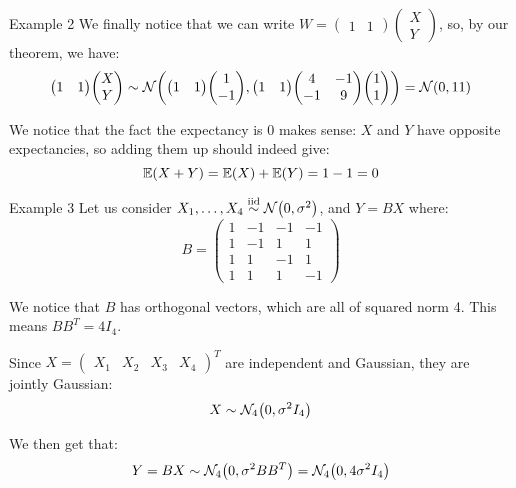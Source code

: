 \documentclass[a4paper]{article}
\begin{document}
\begin{parag}{Example 2}
    We finally notice that we can write $W = \begin{pmatrix} 1 & 1 \end{pmatrix} \begin{pmatrix} X \\ Y \end{pmatrix} $, so, by our theorem, we have: 
    \[\begin{pmatrix} 1 & 1 \end{pmatrix} \begin{pmatrix} X \\ Y \end{pmatrix} \followsdistr \mathcal{N}\left(\begin{pmatrix} 1 & 1 \end{pmatrix} \begin{pmatrix} 1 \\ -1 \end{pmatrix} , \begin{pmatrix} 1 & 1 \end{pmatrix} \begin{pmatrix} 4 & -1 \\ -1 & 9 \end{pmatrix} \begin{pmatrix} 1 \\ 1 \end{pmatrix} \right) = \mathcal{N}\left(0, 11\right)\]
    
    We notice that the fact the expectancy is 0 makes sense: $X$ and $Y$ have opposite expectancies, so adding them up should indeed give: 
    \[\exval\left(X + Y\right) = \exval\left(X\right)+ \exval\left(Y\right) = 1 - 1 = 0\]
\end{parag}

\begin{parag}{Example 3}
    Let us consider $X_1, \ldots, X_4 \iid \mathcal{N}\left(0, \sigma^2\right)$, and $Y = BX$ where: 
    \[B = \begin{pmatrix} 1 & -1 & -1 & -1 \\ 1 & -1 & 1 & 1 \\ 1 & 1 & -1 & 1 \\ 1 & 1 & 1 & -1 \end{pmatrix} \]

    We notice that $B$ has orthogonal vectors, which are all of squared norm 4. This means $B B^T = 4 I_4$.
    
    Since $X = \begin{pmatrix} X_1 & X_2 & X_3 & X_4 \end{pmatrix}^T$ are independent and Gaussian, they are jointly Gaussian: 
    \[X \followsdistr \mathcal{N}_4\left(0, \sigma^2 I_4\right)\]
    
    We then get that: 
    \[Y = BX \followsdistr \mathcal{N}_4\left(0, \sigma^2 B B^T \right) = \mathcal{N}_4\left(0, 4\sigma^2 I_4\right)\]
\end{parag}
\end{document}
